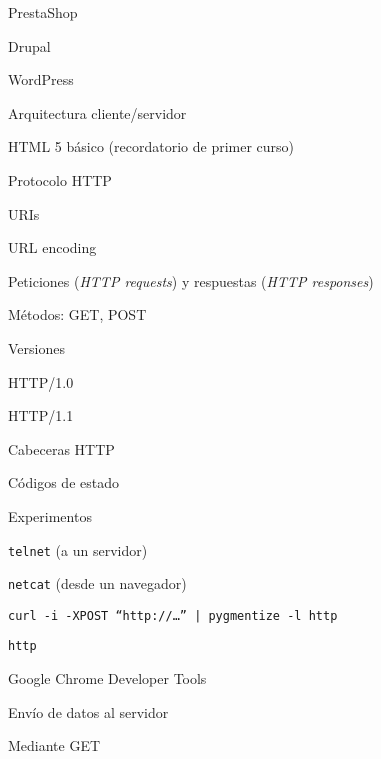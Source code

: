\begin{longenum}
\begin{longenum}
\begin{longenum}
\begin{longenum}
\begin{longenum}
                    \item PrestaShop
                    \item Drupal
                    \item WordPress
                \end{longenum}
            \end{longenum}
        \end{longenum}
        \item Arquitectura cliente/servidor
        \item HTML 5 básico (recordatorio de primer curso)
        \item Protocolo HTTP
        \begin{longenum}
            \item URIs
            \begin{longenum}
                \item URL encoding
            \end{longenum}
            \item Peticiones (\textit{HTTP requests}) y respuestas (\textit{HTTP responses})
            \item Métodos: GET, POST
            \item Versiones
            \begin{longenum}
                \item HTTP/1.0
                \item HTTP/1.1
            \end{longenum}
            \item Cabeceras HTTP
            \item Códigos de estado
            \item Experimentos
            \begin{longenum}
                \item \texttt{telnet} (a un servidor)
                \item \texttt{netcat} (desde un navegador)
                \item \texttt{curl -i -XPOST “http://…” | pygmentize -l http}
                \item \texttt{http}
                \item Google Chrome Developer Tools
            \end{longenum}
            \item Envío de datos al servidor
            \begin{longenum}
                \item Mediante GET

\end{longenum}
\end{longenum}
\end{longenum}
\end{longenum}
